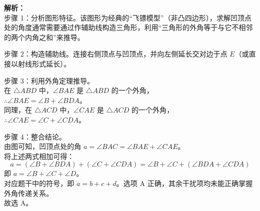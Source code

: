 \documentclass[12pt,a4paper]{exam-zh}
\begin{document}
\begin{solution}
    \textbf{解析：} \\
    步骤 1：分析图形特征。该图形为经典的“飞镖模型”（非凸四边形），求解凹顶点处的角度通常需要通过作辅助线构造三角形，利用“三角形的外角等于与它不相邻的两个内角之和”来推导。
    
    步骤 2：构造辅助线。连接右侧顶点与凹顶点，并向左侧延长交对边于点 $E$（或直接以射线形式延长）。
    
    \begin{center}
    \end{center}

    步骤 3：利用外角定理推导。\\
    在 $\triangle ABD$ 中，$\angle BAE$ 是 $\triangle ABD$ 的一个外角，\\
    $\therefore \angle BAE = \angle B + \angle BDA$。\\
    同理，在 $\triangle ACD$ 中，$\angle CAE$ 是 $\triangle ACD$ 的一个外角，\\
    $\therefore \angle CAE = \angle C + \angle CDA$。
    
    步骤 4：整合结论。\\
    由图可知，凹顶点处的角 $a = \angle BAC = \angle BAE + \angle CAE$。\\
    将上述两式相加可得：
    \[ \displaystyle a = (\angle B + \angle BDA) + (\angle C + \angle CDA) = \angle B + \angle C + (\angle BDA + \angle CDA) \]
    即 $a = \angle B + \angle C + \angle D$。\\
    对应题干中的符号，即 $a = b + c + d$。选项 A 正确，其余干扰项均未能正确掌握外角传递关系。\\
    故选 A。
\end{solution}
\end{document}
